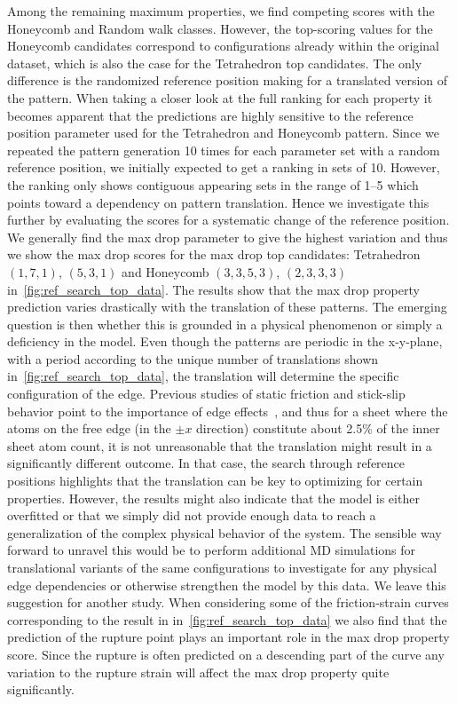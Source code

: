 Among the remaining maximum properties, we find competing scores with the
Honeycomb and Random walk classes. However, the top-scoring values for the
Honeycomb candidates correspond to configurations already within the original
dataset, which is also the case for the Tetrahedron top candidates. The only
difference is the randomized reference position making for a translated version
of the pattern. When taking a closer look at the full ranking for each property
it becomes apparent that the predictions are highly sensitive to the reference
position parameter used for the Tetrahedron and Honeycomb pattern. Since we repeated the pattern generation 10 times for each parameter set with a random reference position, we initially expected to get a ranking in sets of 10. However, the ranking only
shows contiguous appearing sets in the range of 1--5 which points toward a
dependency on pattern translation. Hence we investigate this further by
evaluating the scores for a systematic change of the reference position. We
generally find the max drop parameter to give the highest variation and thus we
show the max drop scores for the max drop top candidates: Tetrahedron $(1,7,1)$,
$(5,3,1)$ and Honeycomb $(3,3,5,3)$, $(2,3,3,3)$
in~\cref{fig:ref_search_top_data}. The results show that the max drop property prediction varies drastically with the translation of these patterns. The emerging question is
then whether this is grounded in a physical phenomenon or simply a
deficiency in the model. Even though the patterns are periodic in the
x-y-plane, with a period according to the unique number of translations shown in~\cref{fig:ref_search_top_data}, the translation will determine the specific
configuration of the edge. Previous studies of static friction and stick-slip
behavior point to the importance of edge effects~\cite{Varini_2015}, and thus for a sheet where the atoms on the free edge (in the $\pm x$ direction) constitute about 2.5\% of the inner sheet atom count, it is not
unreasonable that the translation might result in a significantly different
outcome. In that case, the search through reference positions highlights that
the translation can be key to optimizing for certain properties. However, the
results might also indicate that the model is either overfitted or that we
simply did not provide enough data to reach a generalization of the complex
physical behavior of the system. The sensible way forward to unravel this would
be to perform additional \acrshort{MD} simulations for translational variants of the same configurations to
investigate for any physical edge dependencies or otherwise strengthen the
model by this data. We leave this suggestion for another study. When considering some of the friction-strain curves corresponding to the result in in~\cref{fig:ref_search_top_data} we also find that the prediction of the rupture point plays an important role in the max drop property score. Since the rupture is often predicted on a descending part of the curve any variation to the rupture strain will affect the max drop property quite significantly.


